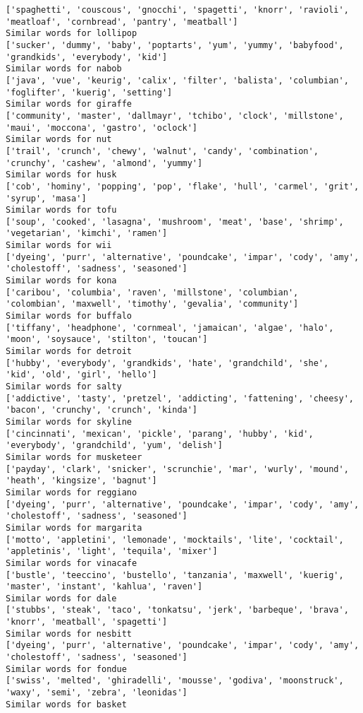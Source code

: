 \documentclass[11pt]{article}
\begin{document}
\begin{Verbatim}[commandchars=\\\{\}]
['spaghetti', 'couscous', 'gnocchi', 'spagetti', 'knorr', 'ravioli', 'meatloaf', 'cornbread', 'pantry', 'meatball']
Similar words for lollipop
['sucker', 'dummy', 'baby', 'poptarts', 'yum', 'yummy', 'babyfood', 'grandkids', 'everybody', 'kid']
Similar words for nabob
['java', 'vue', 'keurig', 'calix', 'filter', 'balista', 'columbian', 'foglifter', 'kuerig', 'setting']
Similar words for giraffe
['community', 'master', 'dallmayr', 'tchibo', 'clock', 'millstone', 'maui', 'moccona', 'gastro', 'oclock']
Similar words for nut
['trail', 'crunch', 'chewy', 'walnut', 'candy', 'combination', 'crunchy', 'cashew', 'almond', 'yummy']
Similar words for husk
['cob', 'hominy', 'popping', 'pop', 'flake', 'hull', 'carmel', 'grit', 'syrup', 'masa']
Similar words for tofu
['soup', 'cooked', 'lasagna', 'mushroom', 'meat', 'base', 'shrimp', 'vegetarian', 'kimchi', 'ramen']
Similar words for wii
['dyeing', 'purr', 'alternative', 'poundcake', 'impar', 'cody', 'amy', 'cholestoff', 'sadness', 'seasoned']
Similar words for kona
['caribou', 'columbia', 'raven', 'millstone', 'columbian', 'colombian', 'maxwell', 'timothy', 'gevalia', 'community']
Similar words for buffalo
['tiffany', 'headphone', 'cornmeal', 'jamaican', 'algae', 'halo', 'moon', 'soysauce', 'stilton', 'toucan']
Similar words for detroit
['hubby', 'everybody', 'grandkids', 'hate', 'grandchild', 'she', 'kid', 'old', 'girl', 'hello']
Similar words for salty
['addictive', 'tasty', 'pretzel', 'addicting', 'fattening', 'cheesy', 'bacon', 'crunchy', 'crunch', 'kinda']
Similar words for skyline
['cincinnati', 'mexican', 'pickle', 'parang', 'hubby', 'kid', 'everybody', 'grandchild', 'yum', 'delish']
Similar words for musketeer
['payday', 'clark', 'snicker', 'scrunchie', 'mar', 'wurly', 'mound', 'heath', 'kingsize', 'bagnut']
Similar words for reggiano
['dyeing', 'purr', 'alternative', 'poundcake', 'impar', 'cody', 'amy', 'cholestoff', 'sadness', 'seasoned']
Similar words for margarita
['motto', 'appletini', 'lemonade', 'mocktails', 'lite', 'cocktail', 'appletinis', 'light', 'tequila', 'mixer']
Similar words for vinacafe
['bustle', 'teeccino', 'bustello', 'tanzania', 'maxwell', 'kuerig', 'master', 'instant', 'kahlua', 'raven']
Similar words for dale
['stubbs', 'steak', 'taco', 'tonkatsu', 'jerk', 'barbeque', 'brava', 'knorr', 'meatball', 'spagetti']
Similar words for nesbitt
['dyeing', 'purr', 'alternative', 'poundcake', 'impar', 'cody', 'amy', 'cholestoff', 'sadness', 'seasoned']
Similar words for fondue
['swiss', 'melted', 'ghiradelli', 'mousse', 'godiva', 'moonstruck', 'waxy', 'semi', 'zebra', 'leonidas']
Similar words for basket

\end{Verbatim}
\end{document}
